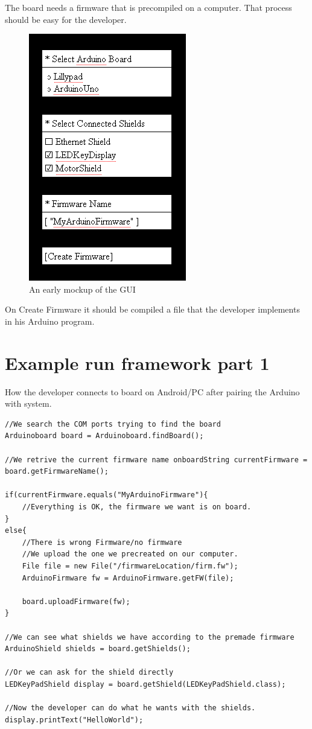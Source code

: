 The board needs a firmware that is precompiled on a computer.
That process should be easy for the developer.

\begin{figure}
	\centering
	\includegraphics{./img/architecture-mockupgui.png}
	\caption{An early mockup of the GUI}
	\label{fig:architecture-mockupgui}
\end{figure}

On Create Firmware it should be compiled a file that the developer implements in his Arduino program.

\section{Example run framework part 1}

How the developer connects to board on Android/PC after pairing the Arduino with system.

\javacode
\begin{lstlisting}
//We search the COM ports trying to find the board
Arduinoboard board = Arduinoboard.findBoard();

//We retrive the current firmware name onboardString currentFirmware = board.getFirmwareName();

if(currentFirmware.equals("MyArduinoFirmware"){
    //Everything is OK, the firmware we want is on board.
}
else{
    //There is wrong Firmware/no firmware
    //We upload the one we precreated on our computer.
    File file = new File("/firmwareLocation/firm.fw");
    ArduinoFirmware fw = ArduinoFirmware.getFW(file);

    board.uploadFirmware(fw);
}

//We can see what shields we have according to the premade firmware
ArduinoShield shields = board.getShields();

//Or we can ask for the shield directly
LEDKeyPadShield display = board.getShield(LEDKeyPadShield.class);

//Now the developer can do what he wants with the shields.
display.printText("HelloWorld");
\end{lstlisting}

